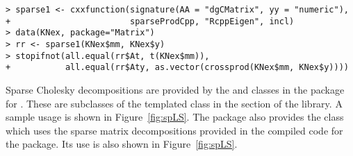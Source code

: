 \documentclass[shortnames,article,nojss]{jss}
\begin{document}
\begin{verbatim}
> sparse1 <- cxxfunction(signature(AA = "dgCMatrix", yy = "numeric"),
+                        sparseProdCpp, "RcppEigen", incl)
> data(KNex, package="Matrix")
> rr <- sparse1(KNex$mm, KNex$y)
> stopifnot(all.equal(rr$At, t(KNex$mm)),
+           all.equal(rr$Aty, as.vector(crossprod(KNex$mm, KNex$y))))
\end{verbatim}

Sparse Cholesky decompositions are provided by the
 and  classes in the
 package for .  These are
subclasses of the  templated class in the
 section of the  library.  A sample usage
is shown in Figure~\ref{fig:spLS}.  The  package also
provides the  class which uses the
 sparse matrix decompositions provided in the compiled
code for the  package.  Its use is also shown in
Figure~\ref{fig:spLS}.
\end{document}
